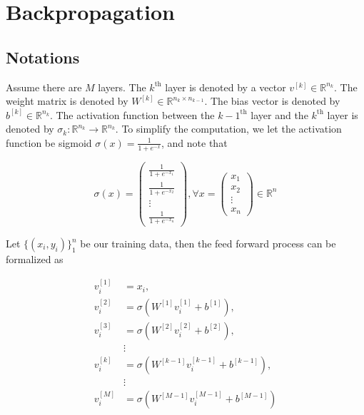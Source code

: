 \documentclass{article}
\begin{document}
    \section{Backpropagation}
        \subsection{Notations}
            Assume there are $M$ layers. The $k^\mathrm{th}$ layer is denoted
            by a vector $v^{ [k] }\in \mathbb{R}^{n_k}$. The weight matrix is
            denoted by $W^{ [k] }\in \mathbb{R}^{ n_k\times n_{k-1} }$. The
            bias vector is denoted by $b^{[k]} \in \mathbb{R}^{n_k}$. The
            activation function between the $k-1^{\mathrm{th}}$ layer and the
            $k^\mathrm{th}$ layer is denoted by $\sigma_k: \mathbb{R}^{n_k}
            \rightarrow \mathbb{R}^{n_k}$. To simplify the computation, we let
            the activation function be sigmoid
            $\sigma(x) = \frac{1}{1+e^{-x}}$, and note that

            \begin{equation*}
                \sigma(x) = \left( 
                    \begin{array}{c}
                        \frac{1}{1+e^{-x_1}} \\
                        \frac{1}{1+e^{-x_2}} \\
                        \vdots \\
                        \frac{1}{1+e^{-x_n}}                         
                    \end{array} \right),\forall x=\left(
                    \begin{array}{c}
                        x_1 \\
                        x_2 \\
                        \vdots \\
                        x_n
                    \end{array} \right) \in \mathbb{R}^n
            \end{equation*}
            
            Let $\{(x_i, y_i)\}_1^n$ be our training data, then the feed
            forward process can be formalized as 

            \begin{equation}\label{forward_nn}
                \begin{split}
                    v_i^{ [1] } & = x_i, \\
                    v_i^{ [2] } & = \sigma (W^{ [1] }v_i^{ [1] } + b^{ [1] }), \\
                    v_i^{ [3] } & = \sigma (W^{ [2] }v_i^{ [2] } + b^{ [2] }), \\
                    & \vdots\\
                    v_i^{ [k] } & = \sigma (W^{ [k-1] } v_i^{ [k-1] } + b^{ [k-1] }), \\
                    & \vdots\\
                    v_i^{ [M] } & = \sigma (W^{ [M-1] } v_i^{ [M-1] } + b^{ [M-1] })
                \end{split}
            \end{equation}
            
\end{document}
